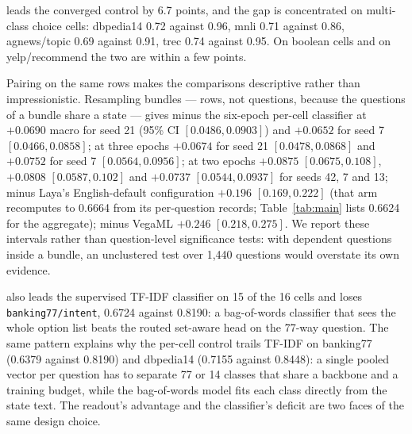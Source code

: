\vsix{} leads the converged control by 6.7 points, and the gap is concentrated on multi-class choice
cells: dbpedia14 0.72 against 0.96, mnli 0.71 against 0.86, agnews/topic 0.69 against 0.91, trec
0.74 against 0.95. On boolean cells and on yelp/recommend the two are within a few points.

Pairing on the same rows makes the comparisons descriptive rather than impressionistic. Resampling
bundles --- rows, not questions, because the questions of a bundle share a state --- gives \vsix{}
minus the six-epoch per-cell classifier at $+0.0690$ macro for seed 21 (95\% CI $[0.0486,0.0903]$)
and $+0.0652$ for seed 7 $[0.0466,0.0858]$; at three
epochs $+0.0674$ for seed 21 $[0.0478,0.0868]$ and $+0.0752$ for seed 7 $[0.0564,0.0956]$; at two
epochs $+0.0875$ $[0.0675,0.108]$, $+0.0808$ $[0.0587,0.102]$ and $+0.0737$ $[0.0544,0.0937]$ for
seeds 42, 7 and 13; minus Laya's English-default configuration $+0.196$ $[0.169,0.222]$ (that arm recomputes to
0.6664 from its per-question records; Table~\ref{tab:main} lists 0.6624 for the aggregate);
minus VegaML $+0.246$ $[0.218,0.275]$. We report these intervals rather than question-level
significance tests: with dependent questions inside a bundle, an unclustered test over 1{,}440
questions would overstate its own evidence.

\vsix{} also leads the supervised TF-IDF classifier on 15 of the 16 cells and loses
\texttt{banking77/intent}, 0.6724 against 0.8190: a bag-of-words classifier that sees the whole
option list beats the routed set-aware head on the 77-way question. The same pattern explains why the
per-cell control trails TF-IDF on banking77 (0.6379 against 0.8190) and dbpedia14 (0.7155 against
0.8448): a single pooled vector per question has to separate 77 or 14 classes that share a
backbone and a training budget, while the bag-of-words model fits each class directly from the state
text. The readout's advantage and the classifier's deficit are two faces of the same design choice.

